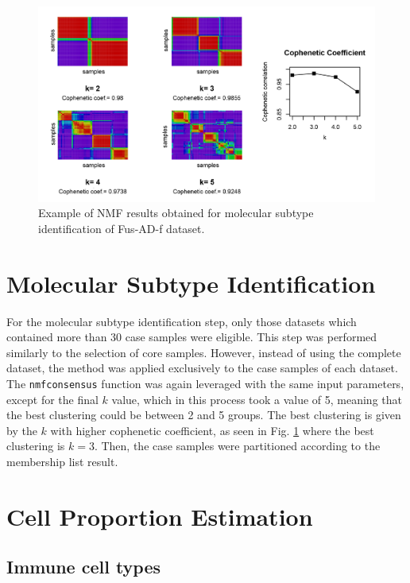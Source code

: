 \begin{figure}[ht]
    \centerline{\includegraphics[width = 15cm]{Figures/consensus.jpg}}
\caption{Example of NMF results obtained for molecular subtype identification of Fus-AD-f dataset.}
\label{fig:consensus}
\end{figure}


\section{Molecular Subtype Identification} \label{subtype-method}

For the molecular subtype identification step, only those datasets which contained more than 30 case samples were eligible. This step was performed similarly to the selection of core samples. However, instead of using the complete dataset, the method was applied exclusively to the case samples of each dataset. The \verb|nmfconsensus| function was again leveraged with the same input parameters, except for the final $k$ value, which in this process took a value of 5, meaning that the best clustering could be between 2 and 5 groups. The best clustering is given by the $k$ with higher cophenetic coefficient, as seen in Fig. \ref{fig:consensus} where the best clustering is $k=3$. Then, the case samples were partitioned according to the membership list result.

\section{Cell Proportion Estimation} \label{cells-method}

\subsection{Immune cell types} \label{immune-method}

